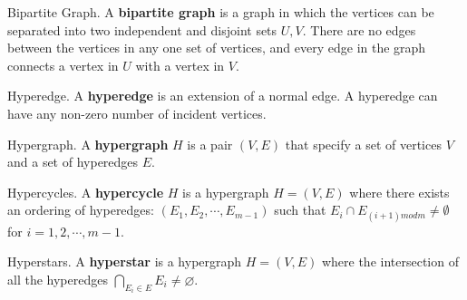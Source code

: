 \begin{definition}{Bipartite Graph.}
    \label{defn:bipartite}
	A \textbf{bipartite graph} is a graph in which the vertices can be separated into two independent and disjoint sets $U,V$. There are no edges between the vertices in any one set of vertices, and every edge in the graph connects a vertex in $U$ with a vertex in $V$.
\end{definition}

\begin{definition}{Hyperedge.}
    \label{defn:hyperedge}
    A \textbf{hyperedge} is an extension of a normal edge. A hyperedge can have any non-zero number of incident vertices.
\end{definition}

\begin{definition}{Hypergraph.}
    \label{defn:hypergraph}
    A \textbf{hypergraph} $H$ is a pair $(V,E)$ that specify a set of vertices $V$ and a set of hyperedges $E$.
\end{definition}

\begin{definition}{Hypercycles.}
    \label{defn:hypercycle}
    A \textbf{hypercycle} $H$ is a hypergraph $H = (V,E)$ where there exists an ordering of hyperedges: $(E_1, E_2, \cdots, E_{m-1})$ such that $E_{i} \cap E_{(i+1) m o d m} \neq \emptyset$ for $i = 1,2,\cdots,m-1$.
\end{definition}

\begin{definition}{Hyperstars.}
    \label{defn:hyperstar}
    A \textbf{hyperstar} is a hypergraph $H = (V,E)$ where the intersection of all the hyperedges $\bigcap_{E_{i} \in E} E_{i} \neq \varnothing$.
\end{definition}